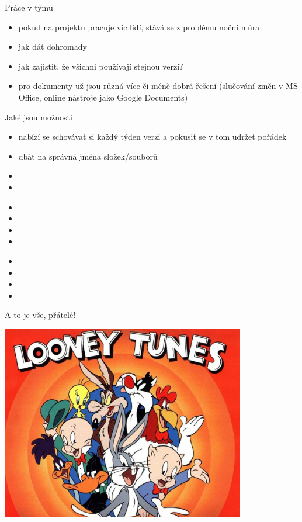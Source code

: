 \documentclass{beamer}
\begin{document}
\begin{frame}{Práce v týmu}
  \begin{itemize}
    \item pokud na projektu pracuje víc lidí, stává se z problému noční můra
    \item jak dát dohromady
    \item jak zajistit, že všichni používají stejnou verzi?
    \item pro dokumenty už jsou různá více či méně dobrá řešení (slučování změn v MS Office, online nástroje jako Google Documents)
  \end{itemize}
\end{frame}

\begin{frame}{Jaké jsou možnosti}
  \begin{itemize}
    \item nabízí se schovávat si každý týden verzi a pokusit se v tom udržet pořádek
    \item dbát na správná jména složek/souborů
    \item
    \item
  \end{itemize}
\end{frame}

\begin{frame}{}
  \begin{itemize}
    \item
    \item
    \item
    \item
  \end{itemize}
\end{frame}

\begin{frame}{}
  \begin{itemize}
    \item
    \item
    \item
    \item
  \end{itemize}
\end{frame}


\begin{frame}{A to je vše, přátelé!}
  \begin{center}
    \includegraphics[width=0.8\textwidth]{looney_tunes}
  \end{center}
\end{frame}
\end{document}

